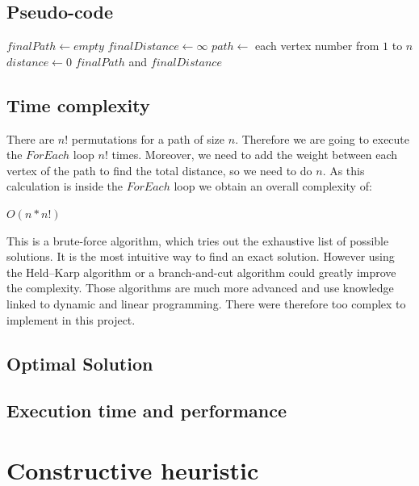 \documentclass[a4paper, 12pt]{report}
\begin{document}
		\section{Pseudo-code}
			\begin{algorithm}
				\DontPrintSemicolon
				\BlankLine
				$finalPath \leftarrow empty$\;
				$finalDistance \leftarrow \infty$\;
				\BlankLine
					$path \leftarrow$ each vertex number from $1$ to $n$\;
					$distance \leftarrow 0$\;
					\BlankLine
				\BlankLine
				\Return $finalPath$ and $finalDistance$\;
			\end{algorithm}
		
		\section{Time complexity}
		There are $n!$ permutations for a path of size $n$. Therefore we are going to execute the $ForEach$ loop $n!$ times.
		Moreover, we need to add the weight between each vertex of the path to find the total distance, so we need to do $n$. As this calculation is inside the $ForEach$ loop we obtain an overall complexity of:
		\begin{center}
			$O(n*n!)$
		\end{center}
		This is a brute-force algorithm, which tries out the exhaustive list of possible solutions. It is the most intuitive way to find an exact solution. However using the Held–Karp algorithm or a branch-and-cut algorithm could greatly improve the complexity. Those algorithms are much more advanced and use knowledge linked to dynamic and linear programming. There were therefore too complex to implement in this project.
		\section{Optimal Solution}
		\section{Execution time and performance}
	
	\chapter{Constructive heuristic}
\end{document}
